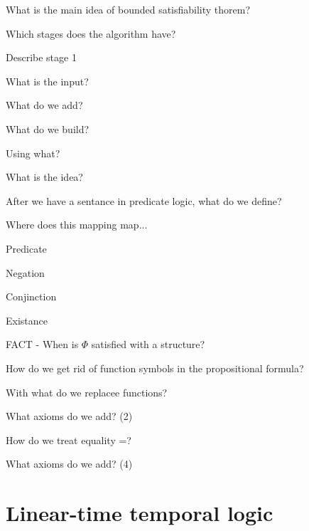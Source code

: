 \documentclass[fleqn]{article}
\begin{document}
\begin{enumerate}
    \item What is the main idea of bounded satisfiability thorem?
    \item Which stages does the algorithm have?
    \item Describe stage 1
    \begin{itemize}
        {\color{blue}\item What is the input?}
        {\color{red}\item What do we add?}
        {\color{blue}\item What do we build?}
        {\color{blue}\item Using what?}
        {\color{blue}\item What is the idea?}
    \end{itemize}
    {\color{red}\item After we have a sentance in predicate logic, what do we define?}
    \item Where does this mapping map...
    \begin{itemize}
        {\color{blue}\item Predicate}
        {\color{red}\item Negation}
        \item Conjinction
        {\color{blue}\item Existance}
    \end{itemize}
    {\color{red}\item FACT - When is $\Phi$ satisfied with a structure?}
    {\color{blue}\item How do we get rid of function symbols in the propositional formula?}
    \begin{itemize}
        {\color{blue}\item With what do we replacee functions?}
        {\color{blue}\item What axioms do we add? (2)}
    \end{itemize}
    {\color{red}\item How do we treat equality =?}
    \begin{itemize}
        {\color{red}\item What axioms do we add? (4)}
    \end{itemize}
\end{enumerate}


\section{Linear-time temporal logic}
\end{document}
